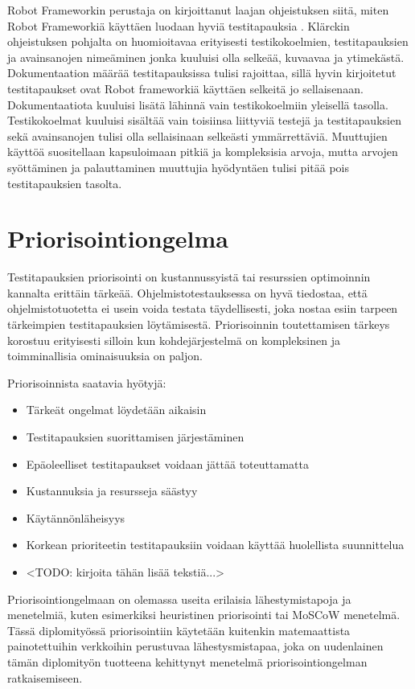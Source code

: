   Robot Frameworkin perustaja on kirjoittanut laajan ohjeistuksen siitä, miten Robot Frameworkiä käyttäen luodaan hyviä testitapauksia \parencite{klarck_how-to-write-good-test-cases_2019}.
  Klärckin ohjeistuksen pohjalta on huomioitavaa erityisesti testikokoelmien, testitapauksien ja avainsanojen nimeäminen jonka kuuluisi olla selkeää, kuvaavaa ja ytimekästä.
  Dokumentaation määrää testitapauksissa tulisi rajoittaa, sillä hyvin kirjoitetut testitapaukset ovat Robot frameworkiä käyttäen selkeitä jo sellaisenaan.
  Dokumentaatiota kuuluisi lisätä lähinnä vain testikokoelmiin yleisellä tasolla.
  Testikokoelmat kuuluisi sisältää vain toisiinsa liittyviä testejä ja testitapauksien sekä avainsanojen tulisi olla sellaisinaan selkeästi ymmärrettäviä.
  Muuttujien käyttöä suositellaan kapsuloimaan pitkiä ja kompleksisia arvoja, mutta arvojen syöttäminen ja palauttaminen muuttujia hyödyntäen tulisi pitää pois testitapauksien tasolta.

\section{Priorisointiongelma} \label{ch:08_priorisointiongelma}

  Testitapauksien priorisointi on kustannussyistä tai resurssien optimoinnin kannalta erittäin tärkeää.
  Ohjelmistotestauksessa on hyvä tiedostaa, että ohjelmistotuotetta ei usein voida testata täydellisesti, joka nostaa esiin tarpeen tärkeimpien testitapauksien löytämisestä.
  Priorisoinnin toutettamisen tärkeys korostuu erityisesti silloin kun kohdejärjestelmä on kompleksinen ja toimminallisia ominaisuuksia on paljon.

  Priorisoinnista saatavia hyötyjä:
  \begin{itemize}
    \item Tärkeät ongelmat löydetään aikaisin
    \item Testitapauksien suorittamisen järjestäminen
    \item Epäoleelliset testitapaukset voidaan jättää toteuttamatta
    \item Kustannuksia ja resursseja säästyy
    \item Käytännönläheisyys
    \item Korkean prioriteetin testitapauksiin voidaan käyttää huolellista suunnittelua
  \end{itemize}

  \begin{itemize}
    \item <TODO: kirjoita tähän lisää tekstiä...>
  \end{itemize}

  Priorisointiongelmaan on olemassa useita erilaisia lähestymistapoja ja menetelmiä, kuten esimerkiksi heuristinen priorisointi tai MoSCoW menetelmä.
  Tässä diplomityössä priorisointiin käytetään kuitenkin matemaattista painotettuihin verkkoihin perustuvaa lähestysmistapaa, joka on uudenlainen tämän diplomityön tuotteena kehittynyt menetelmä priorisointiongelman ratkaisemiseen.
